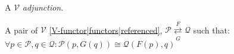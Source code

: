 
A $\mathcal{V}$ \emph{adjunction}.

A pair of $\mathcal{V}$ \ref{V-functor|functors|referenced}, $\mathcal{P}\overset{F}{\underset{G}\rightleftarrows} \mathcal{Q}$ such that: $\forall p\in \mathcal{P}, q \in \mathcal{Q}: \mathcal{P}(p,G(q)) \cong \mathcal{Q}(F(p),q)$
